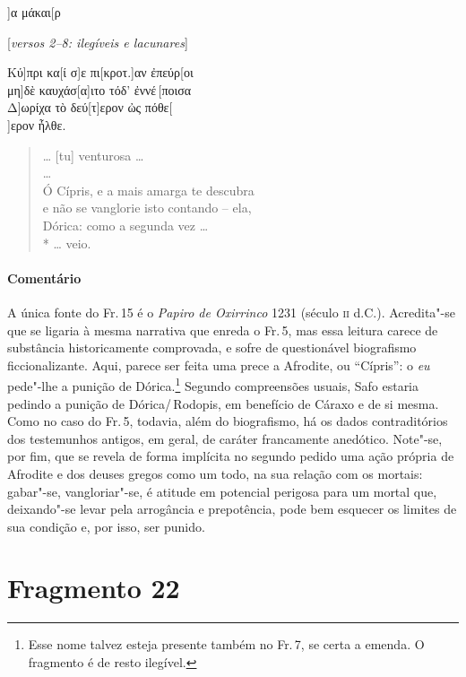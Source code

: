 \begin{gkverse}
]α μάκαι[ρ

\textnormal{[\textit{versos 2--8: ilegíveis e lacunares}]}

Κύ]πρι κα[ί σ]ε πι[κροτ.]αν ἐπεύρ[οι\\
μη]δὲ καυχάσ[α]ιτο τόδ’ ἐννέ\,[ποισα\\
Δ]ωρίχα τὸ δεύ[τ]ερον ὠς πόθε[\\
]ερον ἦλθε.

\end{gkverse}

\begin{verse}
\ldots{} [tu] venturosa \ldots{}\\ 
\ldots{}\\
Ó Cípris, e a mais amarga te descubra\\
e não se vanglorie isto contando -- ela,\\
Dórica: como a segunda vez \ldots{}\\*
\ldots{} veio.
\end{verse}

\medskip

{\paragraph{Comentário} A única fonte do Fr.\,15 é o \textit{Papiro de Oxirrinco} 1231 (século \textsc{ii} d.C.). \EP[1]
Acredita"-se que se ligaria à mesma narrativa que enreda o Fr.\,5, mas essa
leitura carece de substância historicamente comprovada, e sofre de
questionável biografismo ficcionalizante. Aqui,
parece ser feita uma prece a Afrodite, ou ``Cípris'': o \textit{eu} pede"-lhe a
punição de Dórica.\footnote{Esse nome talvez esteja presente também no Fr.\,7, se certa a emenda. O fragmento é de resto ilegível.} Segundo compreensões usuais, Safo estaria pedindo a punição
de Dórica/\,Rodopis, em benefício de Cáraxo e de si mesma. Como no caso do Fr.\,5,
todavia, além do biografismo, há os dados contraditórios dos testemunhos
antigos, em geral, de caráter francamente anedótico. Note"-se, por fim, que se
revela de forma implícita no segundo pedido uma ação própria de Afrodite e dos
deuses gregos como um todo, na sua relação com os mortais: gabar"-se,
vangloriar"-se, é atitude em potencial perigosa para um mortal que,
deixando"-se levar pela arrogância e prepotência, pode bem esquecer
os limites de sua condição e, por isso, ser punido.}

\pagebreak


\section{Fragmento 22}

